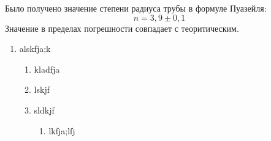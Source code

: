 \documentclass[a4paper,12pt]{article}
\theoremstyle{plain} %
\theoremstyle{definition} %
\theoremstyle{remark} %
\begin{document}
Было получено значение степени радиуса трубы в формуле Пуазейля:
\[n = 3,9\pm0,1\]
Значение в пределах погрешности совпадает с теоритическим.

\renewcommand{\theenumii}{\asbuk{enumii}} 
\begin{enumerate}
	\item alskfja;k
	\begin{enumerate}
		\item kladfja
		\item lskjf
		\item sldkjf
		\begin{enumerate}
			\item lkfja;lfj
		\end{enumerate}
	\end{enumerate}
\end{enumerate}
\end{document}
